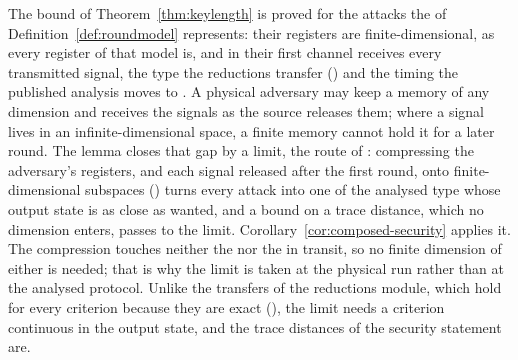 
The bound of Theorem~\ref{thm:keylength} is proved for the attacks the
 of Definition~\ref{def:roundmodel} represents: their
registers are finite-dimensional, as every register of that model is, and in
 their first channel receives every transmitted
signal, the type the reductions transfer
() and the timing the published analysis
moves to \cite[Lemma~8.1]{tupkary2026decoy}. A physical adversary may keep a
memory of any dimension and receives the signals as the source releases
them; where a signal lives in an infinite-dimensional space, a finite memory
cannot hold it for a later round. The lemma closes that gap by a limit, the
route of \cite[Def.~8.2, Sec.~8.2, Thm.~A.1, Rem.~A.2]{tupkary2026decoy}:
compressing the adversary's registers, and each signal released after the
first round, onto finite-dimensional subspaces
() turns every attack into one of
the analysed type whose output state is as close as wanted, and a bound on a
trace distance, which no dimension enters, passes to the limit.
Corollary~\ref{cor:composed-security} applies it. The compression touches
neither the  nor the  in
transit, so no finite dimension of either is needed; that is why the limit is
taken at the physical run rather than at the analysed protocol. Unlike the
transfers of the reductions module, which hold for every criterion because
they are exact (), the limit needs a criterion
continuous in the output state, and the trace distances of the security
statement are.

